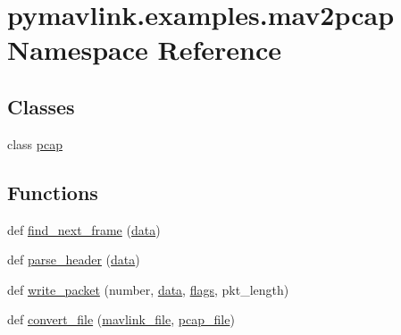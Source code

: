 \hypertarget{namespacepymavlink_1_1examples_1_1mav2pcap}{}\section{pymavlink.\+examples.\+mav2pcap Namespace Reference}
\label{namespacepymavlink_1_1examples_1_1mav2pcap}
\subsection*{Classes}
\begin{DoxyCompactItemize}
\item 
class \mbox{\hyperlink{classpymavlink_1_1examples_1_1mav2pcap_1_1pcap}{pcap}}
\end{DoxyCompactItemize}
\subsection*{Functions}
\begin{DoxyCompactItemize}
\item 
def \mbox{\hyperlink{namespacepymavlink_1_1examples_1_1mav2pcap_a5d5158437d34868add6b1e088d6753dd}{find\+\_\+next\+\_\+frame}} (\mbox{\hyperlink{structdata}{data}})
\item 
def \mbox{\hyperlink{namespacepymavlink_1_1examples_1_1mav2pcap_aa06a4620b8aee3684598edcf147acac8}{parse\+\_\+header}} (\mbox{\hyperlink{structdata}{data}})
\item 
def \mbox{\hyperlink{namespacepymavlink_1_1examples_1_1mav2pcap_a7e184064dd2bcc387dd8932017af128b}{write\+\_\+packet}} (number, \mbox{\hyperlink{structdata}{data}}, \mbox{\hyperlink{_8ycm__extra__conf_8py_abd73d8e4551f1a637280b3876d1ae2e3}{flags}}, pkt\+\_\+length)
\item 
def \mbox{\hyperlink{namespacepymavlink_1_1examples_1_1mav2pcap_a88fd2236fae4bc898ac20ebabacc30a1}{convert\+\_\+file}} (\mbox{\hyperlink{namespacepymavlink_1_1examples_1_1mav2pcap_acc0844001cebabe078ad5c9285760550}{mavlink\+\_\+file}}, \mbox{\hyperlink{namespacepymavlink_1_1examples_1_1mav2pcap_a78f8cdb50a3b8c40542c9fe3cbd57327}{pcap\+\_\+file}})
\end{DoxyCompactItemize}
